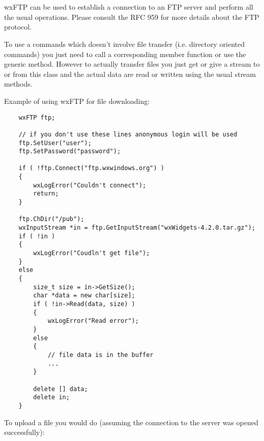 
\section{}\label{wxftp}

wxFTP can be used to establish a connection to an FTP server and perform all the
usual operations. Please consult the RFC 959 for more details about the FTP
protocol.

To use a commands which doesn't involve file transfer (i.e. directory oriented
commands) you just need to call a corresponding member function or use the
generic  method. However to actually
transfer files you just get or give a stream to or from this class and the
actual data are read or written using the usual stream methods.

Example of using wxFTP for file downloading:

\begin{verbatim}
    wxFTP ftp;

    // if you don't use these lines anonymous login will be used
    ftp.SetUser("user");
    ftp.SetPassword("password");

    if ( !ftp.Connect("ftp.wxwindows.org") )
    {
        wxLogError("Couldn't connect");
        return;
    }

    ftp.ChDir("/pub");
    wxInputStream *in = ftp.GetInputStream("wxWidgets-4.2.0.tar.gz");
    if ( !in )
    {
        wxLogError("Coudln't get file");
    }
    else
    {
        size_t size = in->GetSize();
        char *data = new char[size];
        if ( !in->Read(data, size) )
        {
            wxLogError("Read error");
        }
        else
        {
            // file data is in the buffer
            ...
        }

        delete [] data;
        delete in;
    }
\end{verbatim}

To upload a file you would do (assuming the connection to the server was opened
successfully):

